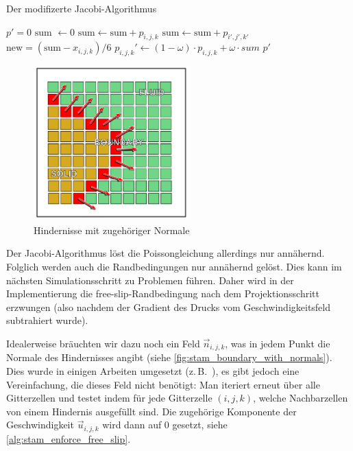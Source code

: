 \begin{algorithm}
\caption{Der modifizerte Jacobi-Algorithmus}
\begin{algorithmic}
	\State $p' = 0$
		\State $\textrm{sum } \gets 0$
				\State $\textrm{sum} \gets \textrm{sum} + p_{i,j,k}$
			\Else
				\State $\textrm{sum} \gets \textrm{sum} + p_{i',j',k'}$
			\EndIf
		\EndFor
		\State $\textrm{new} = (\textrm{sum} - x_{i,j,k})/6$
		\State $p_{i,j,k}' \gets (1-\omega) \cdot p_{i,j,k} + \omega \cdot sum$
	\EndFor
	\State \Return $p'$
\EndFunction
\end{algorithmic}
\label{alg:stam_modified_jacobi_algorithm}
\end{algorithm}

\begin{figure}[ht]
\centering
\includegraphics[width=6cm]{images/boundary_with_normals}
\caption{Hindernisse mit zugehöriger Normale}
\label{fig:stam_boundary_with_normals}
\end{figure}

Der Jacobi-Algorithmus löst die Poissongleichung allerdings nur annähernd.
Folglich werden auch die Randbedingungen nur annähernd gelöst. Dies kann im
nächsten Simulationsschritt zu Problemen führen. Daher wird in der
Implementierung die free-slip-Randbedingung nach dem Projektionsschritt
erzwungen (also nachdem der Gradient des Drucks vom Geschwindigkeitsfeld
subtrahiert wurde).

Idealerweise bräuchten wir dazu noch ein Feld $\vec{n}_{i,j,k}$, was in jedem
Punkt die Normale des Hindernisses angibt (siehe
\autoref{fig:stam_boundary_with_normals}). Dies wurde in einigen
Arbeiten umgesetzt (z.\,B.\ \cite{Bordignon}), es gibt jedoch eine Vereinfachung,
die dieses Feld nicht benötigt: Man iteriert erneut über alle
Gitterzellen und testet indem für jede Gitterzelle $(i,j,k)$, welche
Nachbarzellen von einem Hindernis ausgefüllt sind. Die zugehörige
Komponente der Geschwindigkeit $\vec{u}_{i,j,k}$ wird dann auf 0
gesetzt, siehe \autoref{alg:stam_enforce_free_slip}.

